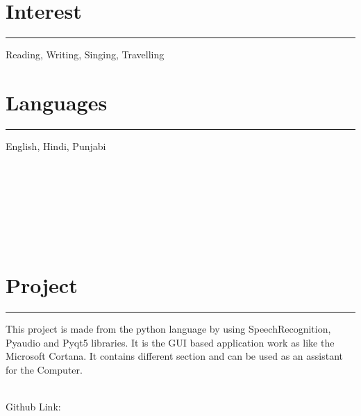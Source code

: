 \documentclass[]{vishal-kathpalia}
\begin{document}
\begin{minipage}[t]{0.33\textwidth}
\section{Interest}
\noindent\rule{5cm}{0.4pt}

Reading, Writing, Singing, Travelling
\section{Languages}
\noindent\rule{5cm}{0.4pt}

English, Hindi, Punjabi
%
%

\end{minipage} 
\hfill
\begin{minipage}[t]{0.66\textwidth} 
\hspace*{0pt}\hfill    \\
\hspace*{0pt}\hfill    \\
\hspace*{0pt}\hfill    \\
\hspace*{0pt}\hfill    \\
\hspace*{0pt}\hfill    \\
\hspace*{0pt}\hfill    \\
\section{Project}
\noindent\rule{12.5cm}{0.4pt}
\datecolor{} 
\noindent
\hspace{0em}%
\begin{minipage}{0.95\textwidth\vspace{2pt}}
This project is made from the python language by using SpeechRecognition, Pyaudio and Pyqt5 libraries. It is the GUI based application work as like the Microsoft Cortana. It contains different section and can be used as an assistant for the Computer.
\end{minipage}
\\ 
Github Link: \href{https://github.com/Er-Vishal-Kathpalia/Speech-Recognition}{}\\


\end{minipage}
\end{document}
